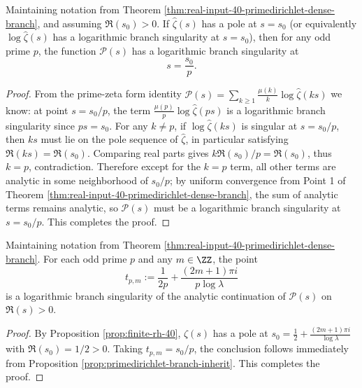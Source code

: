 \begin{proposition}\label{prop:primedirichlet-branch-inherit}
Maintaining notation from Theorem \ref{thm:real-input-40-primedirichlet-dense-branch}, and assuming \(\Re(s_0)>0\).
If \(\widehat{\zeta}(s)\) has a pole at \(s=s_0\) (or equivalently \(\log\widehat{\zeta}(s)\) has a logarithmic branch singularity at \(s=s_0\)), then for any odd prime \(p\), the function \(\mathcal{P}(s)\) has a logarithmic branch singularity at
\[
s=\frac{s_0}{p}.
\]
\end{proposition}
\begin{proof}
From the prime-zeta form identity
\(
\mathcal{P}(s)=\sum_{k\ge 1}\frac{\mu(k)}{k}\log\widehat{\zeta}(ks)
\)
we know: at point \(s=s_0/p\), the term \(\frac{\mu(p)}{p}\log\widehat{\zeta}(ps)\) is a logarithmic branch singularity since \(ps=s_0\).
For any \(k\neq p\), if \(\log\widehat{\zeta}(ks)\) is singular at \(s=s_0/p\), then \(ks\) must lie on the pole sequence of \(\widehat{\zeta}\), in particular satisfying \(\Re(ks)=\Re(s_0)\).
Comparing real parts gives \(k\Re(s_0)/p=\Re(s_0)\), thus \(k=p\), contradiction.
Therefore except for the \(k=p\) term, all other terms are analytic in some neighborhood of \(s_0/p\); by uniform convergence from Point 1 of Theorem \ref{thm:real-input-40-primedirichlet-dense-branch}, the sum of analytic terms remains analytic, so \(\mathcal{P}(s)\) must be a logarithmic branch singularity at \(s=s_0/p\). This completes the proof.
\end{proof}

\begin{corollary}[Family of branch points at \texorpdfstring{$\Re(s)=\frac{1}{2p}$}{Re(s)=1/(2p)} induced by toy-RH critical line poles]\label{cor:real-input-40-primedirichlet-branch-halfp}
Maintaining notation from Theorem \ref{thm:real-input-40-primedirichlet-dense-branch}. For each odd prime \(p\) and any \(m\in\ZZ\), the point
\[
t_{p,m}:=\frac{1}{2p}+\frac{(2m+1)\pi i}{p\log\lambda}
\]
is a logarithmic branch singularity of the analytic continuation of \(\mathcal{P}(s)\) on \(\Re(s)>0\).
\end{corollary}
\begin{proof}
By Proposition \ref{prop:finite-rh-40}, \(\widehat{\zeta}(s)\) has a pole at
\(
s_0=\frac12+\frac{(2m+1)\pi i}{\log\lambda}
\)
with \(\Re(s_0)=1/2>0\). Taking \(t_{p,m}=s_0/p\), the conclusion follows immediately from Proposition \ref{prop:primedirichlet-branch-inherit}. This completes the proof.
\end{proof}

